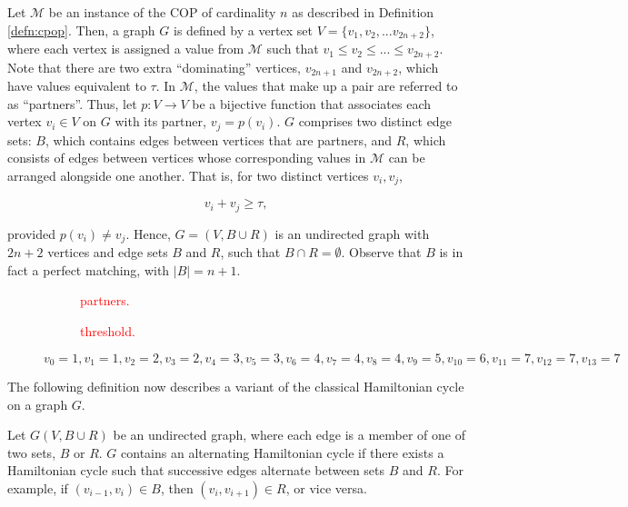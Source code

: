 \documentclass[oribibl]{llncs}
\begin{document}
Let $\mathcal{M}$ be an instance of the COP of cardinality $n$ as described in Definition \ref{defn:cpop}. Then, a graph $G$ is defined by a vertex set $V = \{v_1, v_2, ...v_{2n+2}\}$, where each vertex is assigned a value from $\mathcal{M}$ such that $v_1 \leq v_2 \leq ... \leq v_{2n+2}$. Note that there are two extra ``dominating'' vertices, $v_{2n+1}$ and $v_{2n+2}$, which have values equivalent to $\tau$. In $\mathcal{M}$, the values that make up a pair are referred to as ``partners''. Thus, let $p: V \to V$ be a bijective function that associates each vertex $v_i \in V$ on $G$ with its partner, $v_j = p(v_i)$. $G$ comprises two distinct edge sets: $B$, which contains edges between vertices that are partners, and $R$, which consists of edges between vertices whose corresponding values in $\mathcal{M}$ can be arranged alongside one another. That is, for two distinct vertices $v_i, v_j$,

\begin{equation}
	\label{eqn:jointsum}
	v_i + v_j \geq \tau,
\end{equation}

provided $p(v_i) \neq v_j$. Hence, $G=(V, B \cup R)$ is an undirected graph with $2n + 2$ vertices and edge sets $B$ and $R$, such that $B \cap R = \emptyset$. Observe that $B$ is in fact a perfect matching, with $|B|= n+1$.


\begin{figure}	
\centering
\begin{subfigure}[h]{0.45\textwidth}
	
	\caption{\textcolor{red}{partners.}}	
	\label{fig:partners}
\end{subfigure} \hspace{40pt}
\begin{subfigure}[h]{0.45\textwidth}
	
	\caption{\textcolor{red}{threshold.}}	
	\label{fig:threshold}
\end{subfigure}
\caption{$v_0 = 1, v_1 = 1, v_2 = 2, v_3 = 2, v_4 = 3, v_5 = 3, v_6 = 4, v_7 = 4, v_8 = 4, v_9 = 5, v_{10} = 6, v_{11} = 7, v_{12} = 7, v_{13} = 7$}
\end{figure}

The following definition now describes a variant of the classical Hamiltonian cycle on a graph $G$.

\begin{definition}
	\label{defn:althamcycle}
	Let $G(V, B\cup R)$ be an undirected graph, where each edge is a member of one of two sets, $B$ or $R$. $G$ contains an alternating Hamiltonian cycle if there exists a Hamiltonian cycle such that successive edges alternate between sets $B$ and $R$. For example, if $(v_{i-1}, v_i) \in B$, then $(v_i, v_{i+1}) \in R$, or vice versa.
\end{definition}
\end{document}
